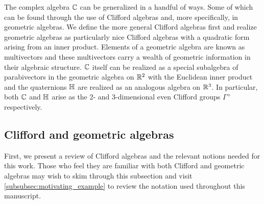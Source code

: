 The complex algebra $\mathbb{C}$ can be generalized in a handful of ways.  Some of which can be found through the use of Clifford algebras and, more specifically, in geometric algebras.  We define the more general Clifford algebras first and realize geometric algebras as particularly nice Clifford algebras with a quadratic form arising from an inner product. Elements of a geometric algebra are known as multivectors and these multivectors carry a wealth of geometric information in their algebraic structure. $\mathbb{C}$ itself can be realized as a special subalgebra of parabivectors in the geometric algebra on $\mathbb{R}^2$ with the Euclidean inner product and the quaternions $\mathbb{H}$ are realized as an analogous algebra on $\mathbb{R}^3$. In particular, both $\mathbb{C}$ and $\mathbb{H}$ arise as the 2- and 3-dimensional even Clifford groups $\Gamma^+$ respectively. 

\subsection{Clifford and geometric algebras}

First, we present a review of Clifford algebras and the relevant notions needed for this work. Those who feel they are familiar with both Clifford and geometric algebras may wish to skim through this subsection and visit \cref{subsubsec:motivating_example} to review the notation used throughout this manuscript. 

